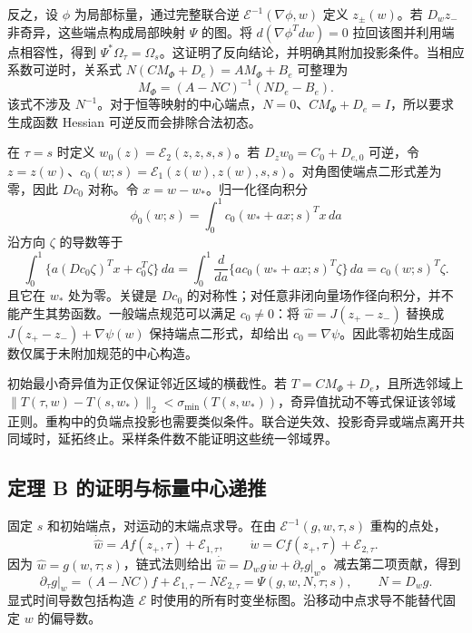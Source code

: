 反之，设 $\phi$ 为局部标量，通过完整联合逆 $\mathcal E^{-1}(\nabla\phi,w)$ 定义 $z_\pm(w)$。若 $D_wz_-$ 非奇异，这些端点构成局部映射 $\Psi$ 的图。将 $d(\nabla\phi^Tdw)=0$ 拉回该图并利用端点相容性，得到 $\Psi^*\Omega_\tau=\Omega_s$。这证明了反向结论，并明确其附加投影条件。当相应系数可逆时，关系式 $N(CM_\Phi+D_e)=AM_\Phi+B_e$ 可整理为
\begin{equation}
 M_\Phi=(A-NC)^{-1}(ND_e-B_e).
 \label{eq:sup-reconstruct}
\end{equation}
该式不涉及 $N^{-1}$。对于恒等映射的中心端点，$N=0$、$CM_\Phi+D_e=I$，所以要求生成函数 Hessian 可逆反而会排除合法初态。

在 $\tau=s$ 时定义 $w_0(z)=\mathcal E_2(z,z,s,s)$。若 $D_zw_0=C_0+D_{e,0}$ 可逆，令 $z=z(w)$、$c_0(w;s)=\mathcal E_1(z(w),z(w),s,s)$。对角图使端点二形式差为零，因此 $Dc_0$ 对称。令 $x=w-w_*$。归一化径向积分
\begin{equation}
 \phi_0(w;s)=\int_0^1 c_0(w_*+a x;s)^Tx\,da
 \label{eq:sup-radial-gauge}
\end{equation}
沿方向 $\zeta$ 的导数等于
\begin{equation}
 \int_0^1\{a(Dc_0\zeta)^Tx+c_0^T\zeta\}\,da
 =\int_0^1\frac{d}{da}\{a c_0(w_*+a x;s)^T\zeta\}\,da
 =c_0(w;s)^T\zeta.
 \label{eq:sup-radial-proof}
\end{equation}
且它在 $w_*$ 处为零。关键是 $Dc_0$ 的对称性；对任意非闭向量场作径向积分，并不能产生其势函数。一般端点规范可以满足 $c_0\ne0$：将 $\widehat w=J(z_+-z_-)$ 替换成 $J(z_+-z_-)+\nabla\psi(w)$ 保持端点二形式，却给出 $c_0=\nabla\psi$。因此零初始生成函数仅属于未附加规范的中心构造。

初始最小奇异值为正仅保证邻近区域的横截性。若 $T=CM_\Phi+D_e$，且所选邻域上 $\|T(\tau,w)-T(s,w_*)\|_2<\sigma_{\min}(T(s,w_*))$，奇异值扰动不等式保证该邻域正则。重构中的负端点投影也需要类似条件。联合逆失效、投影奇异或端点离开共同域时，延拓终止。采样条件数不能证明这些统一邻域界。

\subsection{定理 B 的证明与标量中心递推}
固定 $s$ 和初始端点，对运动的末端点求导。在由 $\mathcal E^{-1}(g,w,\tau,s)$ 重构的点处，
\begin{equation}
 \dot{\widehat w}=Af(z_+,\tau)+\mathcal E_{1,\tau},\qquad
 \dot w=Cf(z_+,\tau)+\mathcal E_{2,\tau}.
 \label{eq:sup-endpoint-evolution}
\end{equation}
因为 $\widehat w=g(w,\tau;s)$，链式法则给出 $\dot{\widehat w}=D_wg\,\dot w+\partial_\tau g|_w$。减去第二项贡献，得到
\begin{equation}
 \partial_\tau g|_w=(A-NC)f+\mathcal E_{1,\tau}-N\mathcal E_{2,\tau}
 =\Psi(g,w,N,\tau;s),\qquad N=D_wg.
 \label{eq:sup-fixed-pde}
\end{equation}
显式时间导数包括构造 $\mathcal E$ 时使用的所有时变坐标图。沿移动中点求导不能替代固定 $w$ 的偏导数。

